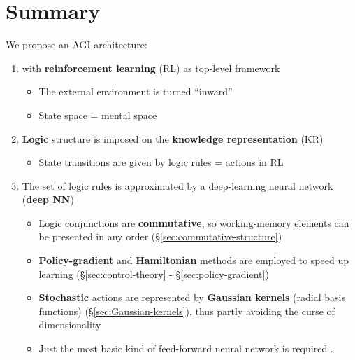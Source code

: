 \documentclass[orivec]{llncs}
\begin{document}


\setcounter{section}{-1}
\section{Summary}
\label{sec:0}

We propose an AGI architecture:
\begin{enumerate}
	\item with \textbf{reinforcement learning} (RL) as top-level framework
	\begin{itemize}
		\item The external environment is turned ``inward''
		\item State space = mental space
	\end{itemize}
	\item \textbf{Logic} structure is imposed on the \textbf{knowledge representation} (KR)
		\begin{itemize}
		\item State transitions are given by logic rules = actions in RL
		\end{itemize}
	\item The set of logic rules is approximated by a deep-learning neural network (\textbf{deep NN})
		\begin{itemize}
		\item Logic conjunctions are \textbf{commutative}, so working-memory elements can be presented in any order (\S\ref{sec:commutative-structure})
		\item \textbf{Policy-gradient} and \textbf{Hamiltonian} methods are employed to speed up learning (\S\ref{sec:control-theory} - \S\ref{sec:policy-gradient})
		\item \textbf{Stochastic} actions are represented by \textbf{Gaussian kernels} (radial basis functions) (\S\ref{sec:Gaussian-kernels}), thus partly avoiding the curse of dimensionality
		\item Just the most basic kind of feed-forward neural network is required .
	\end{itemize}
\end{enumerate}
\end{document}
